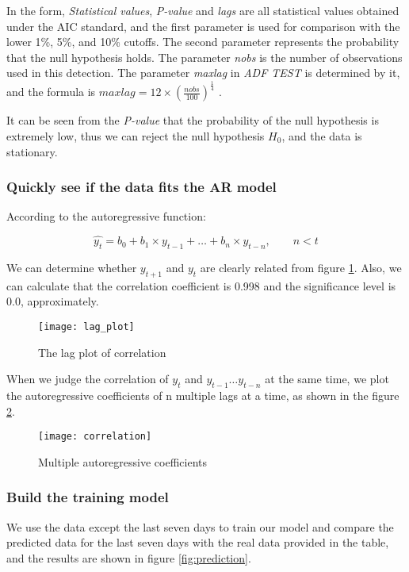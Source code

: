 \documentclass{mcmthesis}
\begin{document}
In the form, \textit{Statistical values}, \textit{P-value} and \textit{lags} are all statistical values obtained under the AIC standard, and the first parameter is used for comparison with the lower 1\%, 5\%, and 10\% cutoffs.
The second parameter represents the probability that the null hypothesis holds.
The parameter \textit{nobs} is the number of observations used in this detection.
The parameter \textit{maxlag} in \textit{ADF TEST} is determined by it, and the formula is $ \displaystyle maxlag = 12 \times ( \frac{nobs}{100}) ^\frac{1}{4} $ .

It can be seen from the \textit{P-value} that the probability of the null hypothesis is extremely low, thus we can reject the null hypothesis $H_0$, and the data is stationary.

\subsubsection{Quickly see if the data fits the AR model}
  According to the autoregressive function:

  \begin{equation}
    \hat{y_t} = b_0 + b_1 \times y_{t - 1} + \ldots + b_n \times y_{t - n}, \qquad n < t
  \end{equation}

  We can determine whether $ y_{t + 1}$ and $ y_t $ are clearly related from figure \ref{fig:lag_plot}. Also, we can calculate that the correlation coefficient is 0.998 and the significance level is 0.0, approximately.

  \begin{figure}[h]
    \centering
    \texttt{[image: lag\_plot]}
    \caption{The lag plot of correlation}
    \label{fig:lag_plot}
  \end{figure}

  When we judge the correlation of $ y_t$ and $ y_{t - 1} \ldots y_{t - n} $ at the same time, we plot the autoregressive coefficients of n multiple lags at a time, as shown in the figure \ref{fig:correlation}.

  \begin{figure}[h]
    \centering
    \texttt{[image: correlation]}
    \caption{Multiple autoregressive coefficients}
    \label{fig:correlation}
  \end{figure}

\subsubsection{Build the training model}
We use the data except the last seven days to train our model and compare the predicted data for the last seven days with the real data provided in the table, and the results are shown in figure \ref{fig:prediction}.
\end{document}
